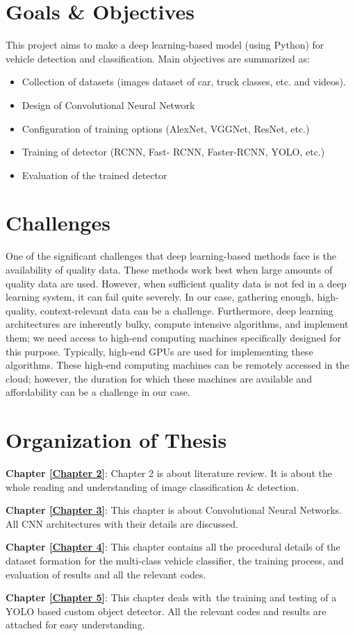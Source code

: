 \section{Goals \& Objectives}

This project aims to make a deep learning-based model (using Python) for vehicle detection and classification. Main objectives are summarized as:
\begin{itemize}
\item Collection of datasets (images dataset of car, truck classes, etc. and videos).
\item Design of Convolutional Neural Network
\item Configuration of training options (AlexNet, VGGNet, ResNet, etc.)
\item Training of detector (RCNN, Fast- RCNN, Faster-RCNN, YOLO, etc.)
\item Evaluation of the trained detector
\end{itemize}

\section{Challenges}

One of the significant challenges that deep learning-based methods
face is the availability of quality data. These methods work
best when large amounts of quality data are used. However,
when sufficient quality data is not fed in a deep learning system,
it can fail quite severely. In our case, gathering enough, high-quality,
context-relevant data can be a challenge.
Furthermore, deep learning architectures are inherently bulky,
compute intensive algorithms, and implement them; we need access to high-end computing machines specifically designed
for this purpose. Typically, high-end GPUs are used for implementing
these algorithms. These high-end computing machines can be
remotely accessed in the cloud; however, the duration for which these
machines are available and affordability can be a challenge in our case.    

\section{Organization of Thesis}

\textbf{Chapter \ref{Chapter 2}}: Chapter 2 is about literature review. It is about
the whole reading and understanding of image classification \& detection.

\noindent\textbf{Chapter \ref{Chapter 3}}: This chapter is about Convolutional Neural Networks. All CNN architectures with their details
are discussed.

\noindent\textbf{Chapter \ref{Chapter 4}}: This chapter contains all
the procedural details of the dataset formation for the multi-class vehicle classifier, the training process, and evaluation of results and all the relevant codes.

\noindent\textbf{Chapter \ref{Chapter 5}}: This chapter deals with\
the training and testing of a YOLO based custom object detector.
All the relevant codes and results are attached for easy understanding.
